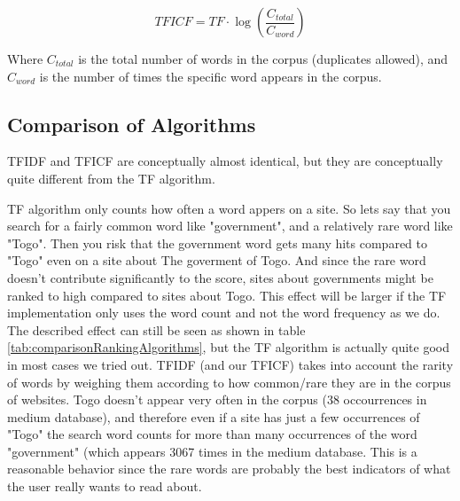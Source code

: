 \[ TFICF = TF \cdot \log{\left( \frac{C_{total}}{C_{word}} \right) } \]

Where \(C_{total}\) is the total number of words in the corpus (duplicates allowed), and \(C_{word}\) is the number of times the specific word appears in the corpus. 

%
%	
%	
%	
%	




\subsection{Comparison of Algorithms}
TFIDF and TFICF are conceptually almost identical, but they are conceptually quite different from the TF algorithm. 

TF algorithm only counts how often a word appers on a site. So lets say that you search for a fairly common word like "government", and a relatively rare word like "Togo". Then you risk that the government word gets many hits compared to "Togo" even on a site about The goverment of Togo. And since the rare word doesn't contribute significantly to the score, sites about governments might be ranked to high compared to sites about Togo. 
This effect will be larger if the TF implementation only uses the word count and not the word frequency as we do. The described effect can still be seen as shown in table \ref{tab:comparisonRankingAlgorithms}, but the TF algorithm is actually quite good in most cases we tried out.   
TFIDF (and our TFICF) takes into account the rarity of words by weighing them according to how common/rare they are in the corpus of websites. 
Togo doesn't appear very often in the corpus (38 occourrences in medium database), and therefore even if a site has just a few occurrences of "Togo" the search word counts for more than many occurrences of the word "government" (which appears 3067 times in the medium database.
This is a reasonable behavior since the rare words are probably the best indicators of what the user really wants to read about.  

